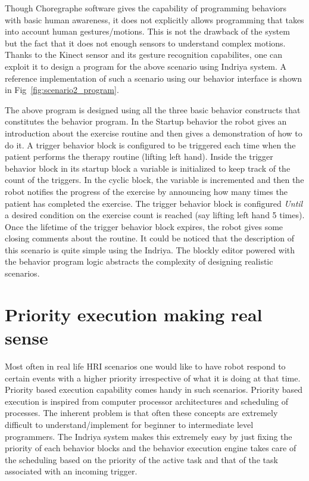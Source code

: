 Though Choregraphe software gives the capability of programming behaviors with basic human awareness, it does not explicitly allows programming that takes into account human gestures/motions. This is not the drawback of the system but the fact that it does not enough sensors to understand complex motions. Thanks to the Kinect sensor and its gesture recognition capabilites, one can exploit it to design a program for the above scenario using Indriya system. A reference implementation of such a scenario using our behavior interface is shown in Fig~\ref{fig:scenario2_program}.

The above program is designed using all the three basic behavior constructs that constitutes the behavior program. In the Startup behavior the robot gives an introduction about the exercise routine and then gives a demonstration of how to do it. A trigger behavior block is configured to be triggered each time when the patient performs the therapy routine (lifting left hand). Inside the trigger behavior block in its startup block a variable is initialized to keep track of the count of the triggers. In the cyclic block, the variable is incremented and then the robot notifies the progress of the exercise by announcing how many times the patient has completed the exercise. The trigger behavior block is configured \emph{Until} a desired condition on the exercise count is reached (say lifting left hand 5 times). Once the lifetime of the trigger behavior block expires, the robot gives some closing comments about the routine. It could be noticed that the description of this scenario is quite simple using the Indriya. The blockly editor powered with the behavior program logic abstracts the complexity of designing realistic scenarios.

\section{Priority execution making real sense}
Most often in real life HRI scenarios one would like to have robot respond to certain events with a higher priority irrespective of what it is doing at that time. Priority based execution capability comes handy in such scenarios. Priority based execution is inspired from computer processor architectures and scheduling of processes. The inherent problem is that often these concepts are extremely difficult to understand/implement for beginner to intermediate level programmers. The Indriya system makes this extremely easy by just fixing the priority of each behavior blocks and the behavior execution engine takes care of the scheduling based on the priority of the active task and that of the task associated with an incoming trigger. 

